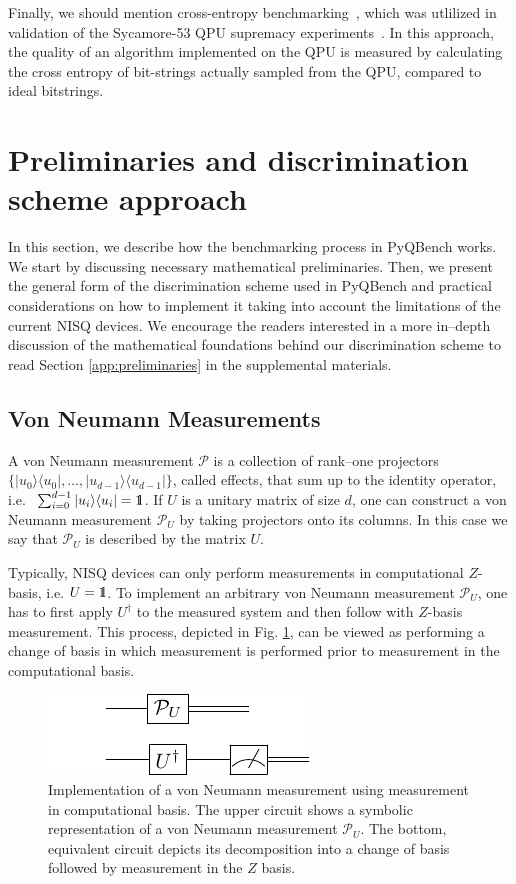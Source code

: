 \documentclass[preprint,12pt, a4paper, dvipsnames]{elsarticle}
\newcommand{\ket}[1]{\ensuremath{|#1\rangle}}
\newcommand{\bra}[1]{\ensuremath{\langle#1|}}
\newcommand{\ketbra}[2]{\ensuremath{\ket{#1}\bra{#2}}}
\newcommand{\proj}[1]{\ensuremath{\ketbra{#1}{#1}}}
\newcommand{\1}{{\rm 1\hspace{-0.9mm}l}}
\newcommand{\PP}{\mathcal{P}}
\theoremstyle{definition}
\begin{document}
Finally, we should mention cross-entropy
benchmarking~\cite{boixo2018characterizing}, which was utlilized in validation
of the Sycamore-53 QPU supremacy experiments~\cite{arute2019quantum}. In this
approach, the quality of an algorithm implemented on the QPU is measured by
calculating the cross entropy of bit-strings actually sampled from the QPU,
compared to ideal bitstrings.

\section{Preliminaries and discrimination scheme approach}

In this section, we describe how the benchmarking process in PyQBench works. We start by
discussing necessary mathematical preliminaries. Then, we present the general form of the
discrimination scheme used in PyQBench and practical considerations on how to implement it taking
into account the limitations of the current NISQ devices. We encourage the readers interested
in a more in--depth discussion of the mathematical foundations behind our discrimination scheme to read
Section \ref{app:preliminaries} in the supplemental materials.

\subsection{Von Neumann Measurements}\label{sec:maths}

A von Neumann measurement $\PP$ is a collection of rank--one projectors
$\{\proj{u_0}, \ldots, \proj{u_{d-1}}\}$, called effects, that sum up to the identity operator, i.e.
$ \, \, \sum_{i=0}^{d-1} \proj{u_i} = \1$. If $U$ is a unitary matrix of size $d$, one can construct
a von Neumann measurement $\PP_{U}$ by taking projectors onto its columns. In this case we say that
$\PP_{U}$ is described by the matrix $U$.

Typically, NISQ devices can only perform measurements in computational $Z$-basis, i.e. $U=\1$. To
implement an arbitrary von Neumann measurement $\PP_{U}$, one has to first apply $U^\dagger$ to the
measured system and then follow with $Z$-basis measurement. This process, depicted in Fig.
\ref{fig:vonneumann}, can be viewed as performing a change of basis in which measurement is
performed prior to measurement in the computational basis.

\begin{figure}[h!]
	\centering
	\includegraphics[scale=1.7]{pics/vonneuman}
	\caption{Implementation of a von Neumann measurement using measurement in computational basis.
	The upper circuit shows a symbolic representation of a von Neumann measurement $\PP_{U}$. The
	bottom, equivalent circuit depicts its decomposition into a change of basis followed
	by measurement in the $Z$ basis.}
	\label{fig:vonneumann}
\end{figure}
\end{document}
